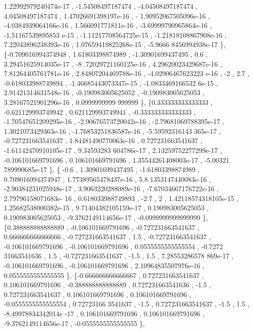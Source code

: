 \begin{DoxyCode}
       1.22992979240474e-17 , -1.54508497187474 , -4.04508497187474 ,  4.04508497187474 , 1.47026691398197e-16 , -
      1.90952067505096e-16 , -4.0384939064166e-16 , 1.566091771811e-16 , -3.69999790965864e-16 , -1.51167539895853
      e-15 , -1.11217708564725e-15 , -1.21818108867908e-16 , 7.22043896238393e-16 , 1.07659419825268e-15 , -5.9666
      8456994938e-17 \},
\{-0.709016994374948 ,  1.61803398874989 , -1.30901699437495 ,               0.6 , 3.29451625914035e-17 , -8
      .72029721160125e-16 , 4.29620023429687e-16 , 7.81264405761781e-16 , 2.84807204469788e-16 , -4.02906467623223
      e-16 ,                -2 ,               2.7 , -0.618033988749894 , -1.46685443073347e-15 , -1.0833469166532
      6e-15 , 2.91421314631548e-16 , -0.190983005625052 , -0.190983005625053 , 3.28167521901296e-16 , 0.0999999999
      999999 \},
\{0.333333333333333 , -0.621129993749942 , 0.621129993749941 , -0.333333333333333 , -1.70547651209295e-16 , 
      -2.90676573720042e-16 , -2.79681069788395e-17 , 1.3021073429363e-16 , -1.76853251836587e-16 , -5.59592316143
      365e-17 , -0.727231663541637 , 1.84481490770063e-16 , 0.727231663541637 , -1.61142470910105e-17 , 9.34593283
      604786e-17 , 2.13259752277299e-17 , -0.106101669791696 , 0.106101669791696 , 1.35544261408003e-17 , -5.00321
      789990685e-17 \},
\{             -0.6 ,  1.30901699437495 , -1.61803398874989 , 0.709016994374947 , 1.77389565478437e-16 , 5.8
      1353147440083e-16 , -2.90384231025948e-17 , 3.9063220288089e-16 , -7.67034667176722e-16 , 2.79796158071683e-
      16 , 0.618033988749893 ,              -2.7 ,                 2 , 1.42118574318105e-15 , 1.25682538000382e-15
       , 9.71404382105159e-17 , 0.190983005625053 , 0.190983005625053 , -9.3762149114656e-17 , -0.0999999999999999
       \},
\{0.388888888888889 , -0.106101669791696 , -0.727231663541637 , 0.666666666666666 , -0.727231663541637 ,    
                 1.5 , -0.727231663541637 , -0.106101669791696 , -0.106101669791696 , 0.0555555555555554 , -0.7272
      31663541636 ,               1.5 , -0.727231663541637 ,              -1.5 ,               1.5 , 7.28553286578
      869e-17 , -0.106101669791696 , -0.106101669791696 , 2.10964835507976e-16 , 0.0555555555555555 \},
\{-0.666666666666667 , 0.727231663541637 , 0.106101669791696 , -0.388888888888889 , 0.727231663541636 ,     
               -1.5 , 0.727231663541637 , 0.106101669791696 , 0.106101669791696 , -0.0555555555555554 , 0.72723166
      3541637 ,              -1.5 , 0.727231663541637 ,              -1.5 ,               1.5 , -8.49978834342014e
      -17 , 0.106101669791696 , 0.106101669791696 , -9.3762149114656e-17 , -0.0555555555555555 \},

\end{DoxyCode}
